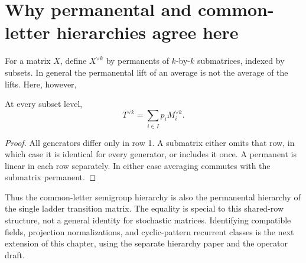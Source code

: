 
\section{Why permanental and common-letter hierarchies agree here}
For a matrix $X$, define $X^{\vee k}$ by permanents of $k$-by-$k$
submatrices, indexed by subsets. In general the permanental lift of an
average is not the average of the lifts. Here, however,
\begin{proposition}\label{ptc-book:permanents}
At every subset level,
\[
 T^{\vee k}=\sum_{i\in I}p_i M_i^{\vee k}.
\]
\end{proposition}
\begin{proof}
All generators differ only in row 1. A submatrix either omits that row,
in which case it is identical for every generator, or includes it once.
A permanent is linear in each row separately. In either case averaging
commutes with the submatrix permanent.
\end{proof}
Thus the common-letter semigroup hierarchy is also the permanental
hierarchy of the single ladder transition matrix. The equality is special
to this shared-row structure, not a general identity for stochastic matrices.
Identifying compatible fields, projection normalizations, and cyclic-pattern
recurrent classes is the next extension of this chapter, using the separate
hierarchy paper and the operator draft.
